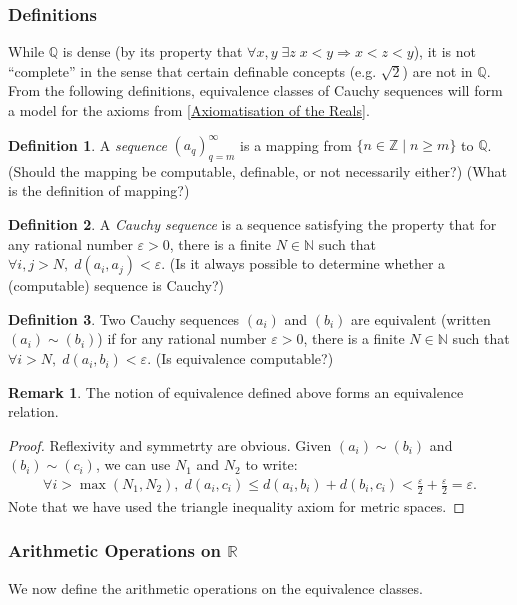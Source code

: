 \documentclass{article}
\theoremstyle{definition}
\newtheorem{defn}{Definition}[subsubsection]
\newtheorem{rmk}{Remark}[subsubsection]
\begin{document}
\subsubsection{Definitions}
While $\mathbb{Q}$ is dense (by its property that $\forall x,y\;\exists z\;x<y\Rightarrow x<z<y$), it is not ``complete'' in the sense that certain definable concepts (e.g. $\sqrt{2}$) are not in $\mathbb{Q}$. From the following definitions, equivalence classes of Cauchy sequences will form a model for the axioms from \ref{Axiomatisation of the Reals}.
\begin{defn}\label{defnsequence}
	A \emph{sequence} $(a_q)_{q=m}^\infty$ is a mapping from $\{n\in\mathbb{Z}\mid n\geq m\}$ to $\mathbb{Q}$. (Should the mapping be computable, definable, or not necessarily either?) (What is the definition of mapping?)
\end{defn}
\begin{defn}
	A \emph{Cauchy sequence} is a sequence satisfying the property that for any rational number $\varepsilon>0$, there is a finite $N\in \mathbb{N}$ such that $\forall i,j>N,\; d(a_i,a_j)<\varepsilon$. (Is it always possible to determine whether a (computable) sequence is Cauchy?)
\end{defn}
\begin{defn}
	Two Cauchy sequences $(a_i)$ and $(b_i)$ are equivalent (written $(a_i)\sim(b_i)$) if for any rational number $\varepsilon>0$, there is a finite $N\in \mathbb{N}$ such that $\forall i>N,\; d(a_i,b_i)<\varepsilon$. (Is equivalence computable?)
\end{defn}
\begin{rmk}
	The notion of equivalence defined above forms an equivalence relation.
\end{rmk}
\begin{proof}
	Reflexivity and symmetrty are obvious. Given $(a_i)\sim(b_i)$ and $(b_i)\sim(c_i)$, we can use $N_1$ and $N_2$ to write:
	\begin{align*}
		\forall i>\max(N_1,N_2),\; d(a_i,c_i)\leq d(a_i,b_i)+d(b_i,c_i)<\frac{\varepsilon}{2}+\frac{\varepsilon}{2}=\varepsilon.
	\end{align*}
	Note that we have used the triangle inequality axiom for metric spaces.
\end{proof}

\subsubsection{Arithmetic Operations on \texorpdfstring{$\mathbb{R}$}{mathbb{R}}}
We now define the arithmetic operations on the equivalence classes.
\end{document}
